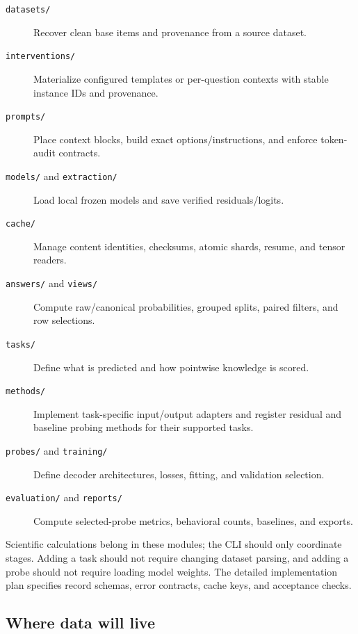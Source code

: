 \documentclass[11pt]{article}
\begin{document}
\begin{description}
\item[\texttt{datasets/}] Recover clean base items and provenance from a source dataset.
\item[\texttt{interventions/}] Materialize configured templates or per-question contexts with stable instance IDs and provenance.
\item[\texttt{prompts/}] Place context blocks, build exact options/instructions, and enforce token-audit contracts.
\item[\texttt{models/} and \texttt{extraction/}] Load local frozen models and save verified residuals/logits.
\item[\texttt{cache/}] Manage content identities, checksums, atomic shards, resume, and tensor readers.
\item[\texttt{answers/} and \texttt{views/}] Compute raw/canonical probabilities, grouped splits, paired filters, and row selections.
\item[\texttt{tasks/}] Define what is predicted and how pointwise knowledge is scored.
\item[\texttt{methods/}] Implement task-specific input/output adapters and register residual and baseline probing methods for their supported tasks.
\item[\texttt{probes/} and \texttt{training/}] Define decoder architectures, losses, fitting, and validation selection.
\item[\texttt{evaluation/} and \texttt{reports/}] Compute selected-probe metrics, behavioral counts, baselines, and exports.
\end{description}
Scientific calculations belong in these modules; the CLI should only coordinate stages.
Adding a task should not require changing dataset parsing, and adding a probe should not require loading model weights.
The detailed implementation plan specifies record schemas, error contracts, cache keys, and acceptance checks.

\subsection*{Where data will live}
\end{document}
